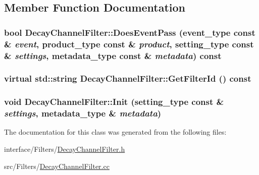 \subsection{Member Function Documentation}
\hypertarget{classDecayChannelFilter_a02700352e9691d39dfc16d5dd0391093}{
\subsubsection[{DoesEventPass}]{\setlength{\rightskip}{0pt plus 5cm}bool DecayChannelFilter::DoesEventPass (event\_\-type const \& {\em event}, \/  product\_\-type const \& {\em product}, \/  setting\_\-type const \& {\em settings}, \/  metadata\_\-type const \& {\em metadata}) const}}
\label{classDecayChannelFilter_a02700352e9691d39dfc16d5dd0391093}
\hypertarget{classDecayChannelFilter_a35656f3ba0c09ccd8297a5b432741deb}{
\subsubsection[{GetFilterId}]{\setlength{\rightskip}{0pt plus 5cm}virtual std::string DecayChannelFilter::GetFilterId () const}}
\label{classDecayChannelFilter_a35656f3ba0c09ccd8297a5b432741deb}
\hypertarget{classDecayChannelFilter_a3ef44e4cca191eeacb2a3c898293ddab}{
\subsubsection[{Init}]{\setlength{\rightskip}{0pt plus 5cm}void DecayChannelFilter::Init (setting\_\-type const \& {\em settings}, \/  metadata\_\-type \& {\em metadata})}}
\label{classDecayChannelFilter_a3ef44e4cca191eeacb2a3c898293ddab}


The documentation for this class was generated from the following files:\begin{DoxyCompactItemize}
\item 
interface/Filters/\hyperlink{DecayChannelFilter_8h}{DecayChannelFilter.h}\item 
src/Filters/\hyperlink{DecayChannelFilter_8cc}{DecayChannelFilter.cc}\end{DoxyCompactItemize}
